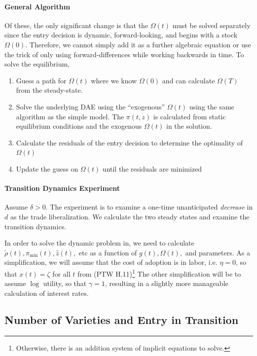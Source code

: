 \documentclass[11pt]{article}
\begin{document}
\paragraph{General Algorithm}
Of these, the only significant change is that the $\Omega(t)$ must be solved separately since the entry decision is dynamic, forward-looking, and begins with a stock $\Omega(0)$.  Therefore, we cannot simply add it as a further algebraic equation or use the trick of only using forward-differences while working backwards in time.  To solve the equilibrium,
\begin{enumerate}
	\item Guess a path for $\Omega(t)$ where we know $\Omega(0)$ and can calculate $\Omega(T)$ from the steady-state.
	\item Solve the underlying DAE using the ``exogenous'' $\Omega(t)$ using the same algorithm as the simple model.  The $\pi(t,z)$ is calculated from static equilibrium conditions and the exogenous $\Omega(t)$ in the solution.
	\item Calculate the residuals of the entry decision to determine the optimality of $\Omega(t)$
	\item Update the guess on $\Omega(t)$ until the residuals are minimized
\end{enumerate}

\paragraph{Transition Dynamics Experiment}

Assume $\delta > 0$. The experiment is to examine a one-time unanticipated \textit{decrease} in $d$ as the trade liberalization.  We calculate the two steady states and examine the transition dynamics.

In order to solve the dynamic problem in, we need to calculate $\tilde{\rho}(t), \pi_{\min}(t),\hat{z}(t),$ etc  as a function of $g(t), \Omega(t),$ and parameters.  As a simplification, we will assume that the cost of adoption is in labor, i.e. $\eta = 0$, so that $x(t) = \zeta$ for all $t$ from (PTW H.11)\footnote{Otherwise, there is an addition system of implicit equations to solve.}  The other simplification will be to assume $\log$ utility, so that $\gamma = 1$, resulting in a slightly more manageable calculation of interest rates.

\subsection{Number of Varieties and Entry in Transition}
\end{document}
